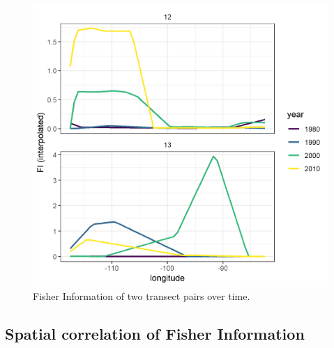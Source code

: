 \documentclass[12pt,twoside,openany]{reedthesis}
\begin{document}
\begin{figure}
\includegraphics[width=0.85\linewidth]{./chapterFiles/fisherSpatial/figures/figsCalledInDiss/interp_FI_singlePair_corPlot_East-West} \caption{Fisher Information of two transect pairs over time. }\label{fig:fiSinglePair}
\end{figure}
\hypertarget{spatial-correlation-of-fisher-information-1}{%
\subsection{Spatial correlation of Fisher Information}\label{spatial-correlation-of-fisher-information-1}}
\end{document}
